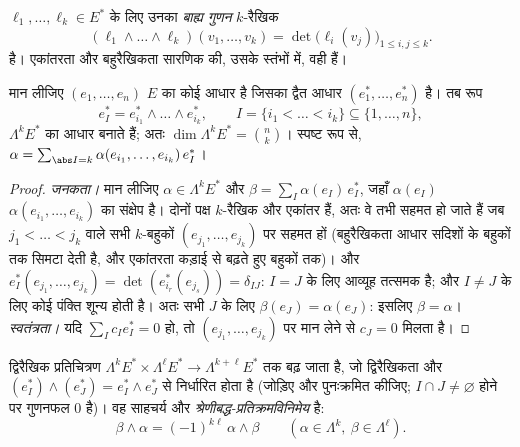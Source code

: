\begin{definition}\label{def:b3:forms:wedge}
$\ell_1, \dots, \ell_k \in E^*$ के लिए उनका \emph{बाह्य गुणन} $k$-रैखिक
\[
(\ell_1 \wedge \dots \wedge \ell_k)(v_1, \dots, v_k)
= \det\bigl(\ell_i(v_j)\bigr)_{1 \leq i, j \leq k} .
\]
है। एकांतरता और बहुरैखिकता सारणिक की, उसके स्तंभों में, वही हैं।
\end{definition}

\begin{proposition}[$\Lambda^k$ का आधार]\label{prop:b3:forms:basis}
मान लीजिए $(e_1, \dots, e_n)$ $E$ का कोई आधार है जिसका द्वैत आधार $(e_1^*, \dots, e_n^*)$ है। तब
रूप
\[
e_I^* = e_{i_1}^* \wedge \dots \wedge e_{i_k}^*,
\qquad I = \{i_1 < \dots < i_k\} \subseteq \{1, \dots, n\},
\]
$\Lambda^kE^*$ का आधार बनाते हैं; अतः $\dim\Lambda^kE^* =
\binom nk$। स्पष्ट रूप से, $\alpha =
\sum_{\abs I = k}\alpha(e_{i_1}, \dots, e_{i_k})\,e_I^*$।
\end{proposition}

\begin{proof}
\emph{जनकता।} मान लीजिए $\alpha \in \Lambda^kE^*$ और $\beta =
\sum_I\alpha(e_I)\,e_I^*$, जहाँ $\alpha(e_I)$ $\alpha(e_{i_1}, \dots, e_{i_k})$ का संक्षेप
है। दोनों पक्ष $k$-रैखिक और एकांतर हैं, अतः वे तभी सहमत हो जाते
हैं जब $j_1 < \dots <
j_k$ वाले सभी $k$-बहुकों $(e_{j_1}, \dots, e_{j_k})$ पर सहमत हों (बहुरैखिकता
आधार सदिशों के बहुकों तक सिमटा देती है, और एकांतरता कड़ाई से बढ़ते
हुए बहुकों तक)। और $e_I^*(e_{j_1},
\dots, e_{j_k}) = \det(e_{i_r}^*(e_{j_s})) = \delta_{IJ}$: $I = J$ के लिए आव्यूह तत्समक है; और $I \neq J$ के
लिए कोई पंक्ति शून्य होती है। अतः सभी $J$ के लिए $\beta(e_J) = \alpha(e_J)$: इसलिए
$\beta = \alpha$। \emph{स्वतंत्रता।} यदि $\sum_I c_Ie_I^* = 0$ हो, तो $(e_{j_1}, \dots, e_{j_k})$ पर मान लेने से
$c_J = 0$ मिलता है।
\end{proof}

\begin{definition}\label{def:b3:forms:wedgegeneral}
 द्विरैखिक प्रतिचित्रण $\Lambda^kE^* \times \Lambda^\ell E^* \to
\Lambda^{k+\ell}E^*$ तक बढ़ जाता है, जो
द्विरैखिकता और $(e_I^*) \wedge (e_J^*) = e_I^* \wedge e_J^*$ से निर्धारित होता है (जोड़िए और पुनःक्रमित
कीजिए; $I \cap J \neq
\varnothing$ होने पर गुणनफल $0$ है)। वह साहचर्य और
\emph{श्रेणीबद्ध-प्रतिक्रमविनिमेय} है:
\[
\beta \wedge \alpha = (-1)^{k\ell}\,\alpha \wedge \beta
\qquad (\alpha \in \Lambda^k, \ \beta \in \Lambda^\ell).
\]
\end{definition}

